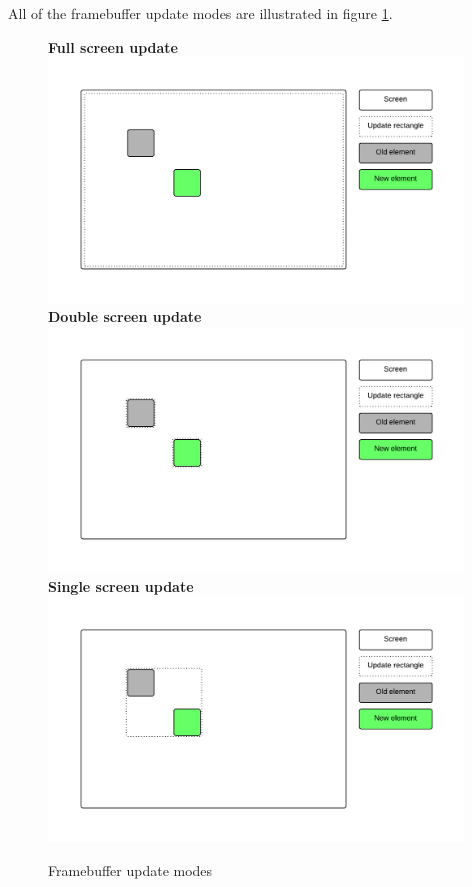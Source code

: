 All of the framebuffer update modes are illustrated in figure \ref{fig:framebuffer-update-modes}.
\begin{figure}
	\label{fig:framebuffer-update-modes}
	\centering
	\textbf{Full screen update} \\
	\includegraphics[width=11cm]{img/update_entire_screen.png}\\
	\textbf{Double screen update} \\
	\includegraphics[width=11cm]{img/update_twice.png}\\
	\textbf{Single screen update} \\
	\includegraphics[width=11cm]{img/update_once.png}\\
	\caption{Framebuffer update modes}
\end{figure}
